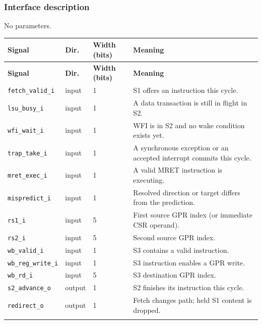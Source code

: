 \documentclass[11pt]{article}
\begin{document}
\subsubsection{Interface description}
\noindent No parameters.\par\medskip
{\small
\begin{longtable}{@{}L{0.3400\dimexpr\linewidth-36pt\relax}L{0.1000\dimexpr\linewidth-36pt\relax}L{0.1000\dimexpr\linewidth-36pt\relax}L{0.4600\dimexpr\linewidth-36pt\relax}@{}}
\toprule
\textbf{Signal} & \textbf{Dir.} & \textbf{Width (bits)} & \textbf{Meaning} \\ \midrule
\endfirsthead
\toprule
\textbf{Signal} & \textbf{Dir.} & \textbf{Width (bits)} & \textbf{Meaning} \\ \midrule
\endhead
\texttt{fetch\_valid\_i} & input & 1 & S1 offers an instruction this cycle. \\ \addlinespace[3pt]
\texttt{lsu\_busy\_i} & input & 1 & A data transaction is still in flight in S2. \\ \addlinespace[3pt]
\texttt{wfi\_wait\_i} & input & 1 & WFI is in S2 and no wake condition exists yet. \\ \addlinespace[3pt]
\texttt{trap\_take\_i} & input & 1 & A synchronous exception or an accepted interrupt commits this cycle. \\ \addlinespace[3pt]
\texttt{mret\_exec\_i} & input & 1 & A valid MRET instruction is executing. \\ \addlinespace[3pt]
\texttt{mispredict\_i} & input & 1 & Resolved direction or target differs from the prediction. \\ \addlinespace[3pt]
\texttt{rs1\_i} & input & 5 & First source GPR index (or immediate CSR operand). \\ \addlinespace[3pt]
\texttt{rs2\_i} & input & 5 & Second source GPR index. \\ \addlinespace[3pt]
\texttt{wb\_valid\_i} & input & 1 & S3 contains a valid instruction. \\ \addlinespace[3pt]
\texttt{wb\_reg\_write\_i} & input & 1 & S3 instruction enables a GPR write. \\ \addlinespace[3pt]
\texttt{wb\_rd\_i} & input & 5 & S3 destination GPR index. \\ \addlinespace[3pt]
\texttt{s2\_advance\_o} & output & 1 & S2 finishes its instruction this cycle. \\ \addlinespace[3pt]
\texttt{redirect\_o} & output & 1 & Fetch changes path; held S1 content is dropped. \\ \addlinespace[3pt]

\end{longtable}}
\end{document}
